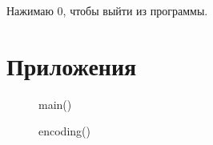\documentclass[12pt, a4paper]{article}
\begin{document}
Нажимаю 0, чтобы выйти из программы.

\labconclusion{}

\newpage

\section{Приложения}

\begin{figure}[h]
    \caption{main()}
    \label{fig:main}
\end{figure}

\begin{figure}[h]
    \caption{encoding()}
    \label{fig:encoding}
\end{figure}
\end{document}
